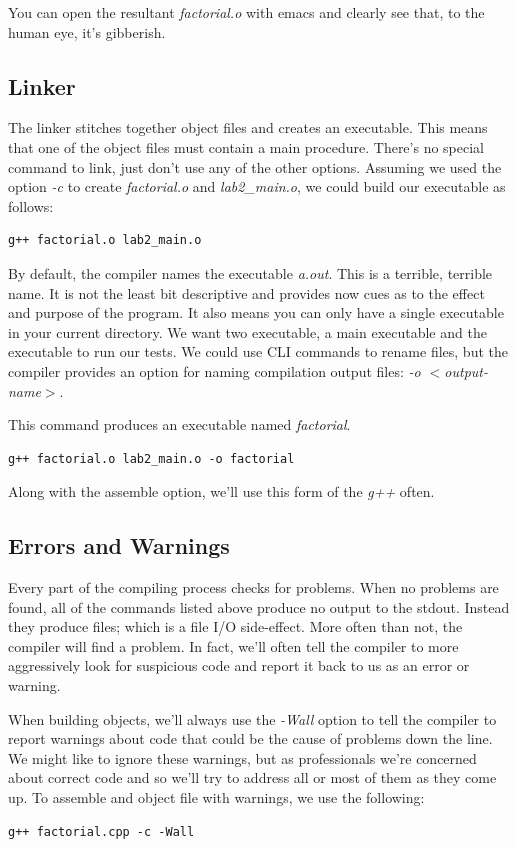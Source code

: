 \documentclass[]{tufte-handout}
\begin{document}
You can open the resultant \textit{factorial.o} with emacs and clearly see that, to the human eye, it's gibberish.  

\subsection{Linker}

The linker stitches together object files and creates an executable.  This means that one of the object files must contain a main procedure.  There's no special command to link, just don't use any of the other options. Assuming we used the option \textit{-c} to create \textit{factorial.o} and \textit{lab2\_main.o}, we could build our executable as follows:
\begin{verbatim}
g++ factorial.o lab2_main.o 
\end{verbatim}
By default, the compiler names the executable \textit{a.out}. This is a terrible, terrible name. It is not the least bit descriptive and provides now cues as to the effect and purpose of the program. It also means you can only have a single executable in your current directory.  We want two executable, a main executable and the executable to run our tests. We could use CLI commands to rename files, but the compiler provides an option for naming compilation output files: \textit{-o $<$output-name$>$}.

This command produces an executable named \textit{factorial}.
\begin{verbatim}
g++ factorial.o lab2_main.o -o factorial
\end{verbatim}
Along with the assemble option, we'll use this form of the \textit{g++} often. 

\subsection{Errors and Warnings}

Every part of the compiling process checks for problems. When no problems are found, all of the commands listed above produce no output to the stdout.  Instead they produce files; which is a file \textsc{I/O} side-effect.  More often than not, the compiler will find a problem. In fact, we'll often tell the compiler to more aggressively look for suspicious code and report it back to us as an error or warning.  

When building objects, we'll always use the \textit{-Wall} option to tell the compiler to report warnings about code that could be the cause of problems down the line. We might like to ignore these warnings, but as professionals we're concerned about correct code and so we'll try to address all or most of them as they come up.  To assemble and object file with warnings, we use the following:
\begin{verbatim}
g++ factorial.cpp -c -Wall 
\end{verbatim}
\end{document}
